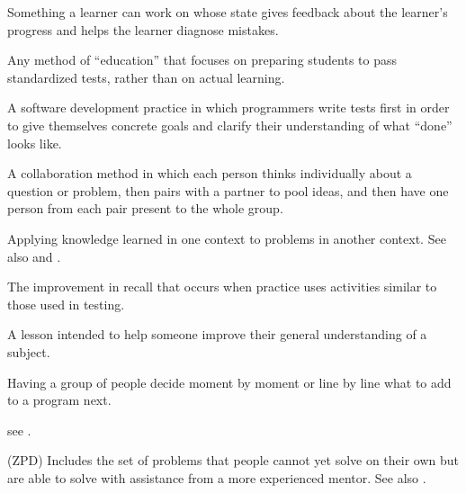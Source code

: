 \begin{description}
 Something a learner can work on
whose state gives feedback about the learner's progress and helps the learner
diagnose mistakes.

 Any method of ``education''
that focuses on preparing students to pass standardized tests, rather than on
actual learning.

 A software
development practice in which programmers write tests first in order to give
themselves concrete goals and clarify their understanding of what ``done'' looks
like.

 A collaboration method in which
each person thinks individually about a question or problem, then pairs with a
partner to pool ideas, and then have one person from each pair present to the
whole group.

 Applying knowledge learned
in one context to problems in another context.  See also
 and .

 The
improvement in recall that occurs when practice uses activities similar to those
used in testing.

 A lesson intended to help someone improve their
general understanding of a subject.

 Having a group of people decide moment
by moment or line by line what to add to a program next.

 see .

 (ZPD) Includes the set of problems that
people cannot yet solve on their own but are able to solve with assistance from
a more experienced mentor.  See also .

\end{description}
